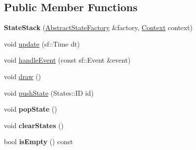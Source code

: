 \subsection*{\-Public \-Member \-Functions}
\begin{DoxyCompactItemize}
\item 
\hypertarget{classStateStack_a237f619f1ee404b3d966fd5dbba98f5a_a237f619f1ee404b3d966fd5dbba98f5a}{{\bfseries \-State\-Stack} (\hyperlink{classAbstractStateFactory}{\-Abstract\-State\-Factory} \&factory, \hyperlink{classContext}{\-Context} context)}\label{classStateStack_a237f619f1ee404b3d966fd5dbba98f5a_a237f619f1ee404b3d966fd5dbba98f5a}

\item 
void \hyperlink{classStateStack_ae90af9f56ce7774d47d0407e2680c27d_ae90af9f56ce7774d47d0407e2680c27d}{update} (sf\-::\-Time dt)
\item 
void \hyperlink{classStateStack_a70d3ffad9da499b8356789115f3e2acf_a70d3ffad9da499b8356789115f3e2acf}{handle\-Event} (const sf\-::\-Event \&event)
\item 
void \hyperlink{classStateStack_a0990b973b2a0bdf8fad2f326e564931a_a0990b973b2a0bdf8fad2f326e564931a}{draw} ()
\item 
void \hyperlink{classStateStack_a5d4d9c5e5d95be4392ef2c95fdc0c047_a5d4d9c5e5d95be4392ef2c95fdc0c047}{push\-State} (\-States\-::\-I\-D id)
\item 
\hypertarget{classStateStack_a7e050a57b798295c2344f1318765b5ee_a7e050a57b798295c2344f1318765b5ee}{void {\bfseries pop\-State} ()}\label{classStateStack_a7e050a57b798295c2344f1318765b5ee_a7e050a57b798295c2344f1318765b5ee}

\item 
\hypertarget{classStateStack_a49f0703d4037c3bf63494e64cb09898d_a49f0703d4037c3bf63494e64cb09898d}{void {\bfseries clear\-States} ()}\label{classStateStack_a49f0703d4037c3bf63494e64cb09898d_a49f0703d4037c3bf63494e64cb09898d}

\item 
\hypertarget{classStateStack_a63a73898d24eb0a68cac0215a9fda4fc_a63a73898d24eb0a68cac0215a9fda4fc}{bool {\bfseries is\-Empty} () const }\label{classStateStack_a63a73898d24eb0a68cac0215a9fda4fc_a63a73898d24eb0a68cac0215a9fda4fc}

\end{DoxyCompactItemize}
